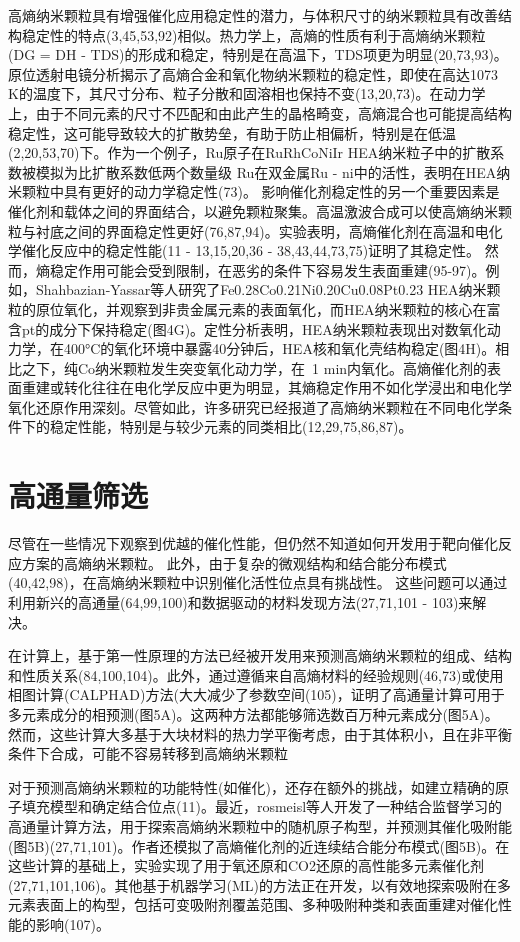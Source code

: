\documentclass[a4paper]{article}
\begin{document}
高熵纳米颗粒具有增强催化应用稳定性的潜力，与体积尺寸的纳米颗粒具有改善结构稳定性的特点(3,45,53,92)相似。热力学上，高熵的性质有利于高熵纳米颗粒(DG = DH - TDS)的形成和稳定，特别是在高温下，TDS项更为明显(20,73,93)。原位透射电镜分析揭示了高熵合金和氧化物纳米颗粒的稳定性，即使在高达1073 K的温度下，其尺寸分布、粒子分散和固溶相也保持不变(13,20,73)。在动力学上，由于不同元素的尺寸不匹配和由此产生的晶格畸变，高熵混合也可能提高结构稳定性，这可能导致较大的扩散势垒，有助于防止相偏析，特别是在低温(2,20,53,70)下。作为一个例子，Ru原子在RuRhCoNiIr HEA纳米粒子中的扩散系数被模拟为比扩散系数低两个数量级
Ru在双金属Ru - ni中的活性，表明在HEA纳米颗粒中具有更好的动力学稳定性(73)。
影响催化剂稳定性的另一个重要因素是催化剂和载体之间的界面结合，以避免颗粒聚集。高温激波合成可以使高熵纳米颗粒与衬底之间的界面稳定性更好(76,87,94)。实验表明，高熵催化剂在高温和电化学催化反应中的稳定性能(11 - 13,15,20,36 - 38,43,44,73,75)证明了其稳定性。
然而，熵稳定作用可能会受到限制，在恶劣的条件下容易发生表面重建(95-97)。例如，Shahbazian-Yassar等人研究了Fe0.28Co0.21Ni0.20Cu0.08Pt0.23 HEA纳米颗粒的原位氧化，并观察到非贵金属元素的表面氧化，而HEA纳米颗粒的核心在富含pt的成分下保持稳定(图4G)。定性分析表明，HEA纳米颗粒表现出对数氧化动力学，在400°C的氧化环境中暴露40分钟后，HEA核和氧化壳结构稳定(图4H)。相比之下，纯Co纳米颗粒发生突变氧化动力学，在~1 min内氧化。高熵催化剂的表面重建或转化往往在电化学反应中更为明显，其熵稳定作用不如化学浸出和电化学氧化还原作用深刻。尽管如此，许多研究已经报道了高熵纳米颗粒在不同电化学条件下的稳定性能，特别是与较少元素的同类相比(12,29,75,86,87)。


\section*{高通量筛选}
尽管在一些情况下观察到优越的催化性能，但仍然不知道如何开发用于靶向催化反应方案的高熵纳米颗粒。
此外，由于复杂的微观结构和结合能分布模式(40,42,98)，在高熵纳米颗粒中识别催化活性位点具有挑战性。
这些问题可以通过利用新兴的高通量(64,99,100)和数据驱动的材料发现方法(27,71,101 - 103)来解决。



在计算上，基于第一性原理的方法已经被开发用来预测高熵纳米颗粒的组成、结构和性质关系(84,100,104)。此外，通过遵循来自高熵材料的经验规则(46,73)或使用相图计算(CALPHAD)方法(大大减少了参数空间(105)，证明了高通量计算可用于多元素成分的相预测(图5A)。这两种方法都能够筛选数百万种元素成分(图5A)。
然而，这些计算大多基于大块材料的热力学平衡考虑，由于其体积小，且在非平衡条件下合成，可能不容易转移到高熵纳米颗粒


对于预测高熵纳米颗粒的功能特性(如催化)，还存在额外的挑战，如建立精确的原子填充模型和确定结合位点(11)。最近，rosmeisl等人开发了一种结合监督学习的高通量计算方法，用于探索高熵纳米颗粒中的随机原子构型，并预测其催化吸附能(图5B)(27,71,101)。作者还模拟了高熵催化剂的近连续结合能分布模式(图5B)。在这些计算的基础上，实验实现了用于氧还原和CO2还原的高性能多元素催化剂(27,71,101,106)。其他基于机器学习(ML)的方法正在开发，以有效地探索吸附在多元素表面上的构型，包括可变吸附剂覆盖范围、多种吸附种类和表面重建对催化性能的影响(107)。
\end{document}

